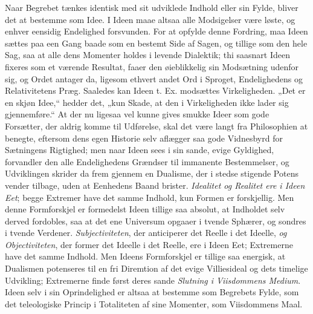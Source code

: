 \documentclass[12pt]{book}
\newcommand{\opage}[1]{\marginnote{\footnotesize\textit{[#1]}}}
\begin{document}
Naar Begrebet tænkes identisk med sit udviklede Indhold eller sin Fylde, bliver det at
bestemme som Idee. I Ideen maae altsaa alle Modsigelser være løste, og enhver eensidig
Endelighed forsvunden. For at opfylde denne Fordring, maa Ideen sættes paa een Gang
baade som en bestemt Side af Sagen, og tillige som den hele Sag, saa at alle dens
Momenter holdes i levende Dialektik; thi saasnart Ideen fixeres som et værende
Resultat, faaer den øieblikkelig sin Modsætning udenfor sig, og Ordet antager da,
ligesom ethvert andet Ord i Sproget, Endelighedens og Relativitetens Præg. Saaledes
kan Ideen t. Ex. modsættes Virkeligheden. „Det er en skjøn Idee,“ hedder det, „kun
Skade, at den i Virkeligheden ikke lader sig gjennemføre.“ At der nu ligesaa vel kunne
gives smukke Ideer som gode Forsætter, der aldrig komme til Udførelse, skal det være
langt fra Philosophien at benegte, eftersom dens egen Historie selv aflægger saa gode
Vidnesbyrd for Sætningens Rigtighed; men naar Ideen sees i sin sande, evige Gyldighed,
forvandler den alle Endelighedens Grændser til immanente Bestemmelser, og Udviklingen
skrider da frem gjennem en Dualisme, der i stedse stigende Potens vender tilbage, uden
\opage{249} %
at Eenhedens Baand brister. \emph{Idealitet og Realitet ere i Ideen Eet}; begge
Extremer have det samme Indhold, kun Formen er forskjellig. Men denne Formforskjel er
formedelst Ideen tillige saa absolut, at Indholdet selv derved fordobles, saa at det
ene Universum opgaaer i tvende Sphærer, og sondres i tvende Verdener.
\emph{Subjectiviteten}, der anticiperer det Reelle i det Ideelle,
\emph{og Objectiviteten}, der former det Ideelle i det Reelle, ere i Ideen Eet;
Extremerne have det samme Indhold. Men Ideens Formforskjel er tillige saa energisk, at
Dualismen potenseres til en fri Diremtion af det evige Villiesideal og dets timelige
Udvikling; Extremerne finde først deres sande \emph{Slutning i Viisdommens Medium}.
Ideen selv i sin Oprindelighed er altsaa at bestemme som Begrebets Fylde, som det
teleologiske Princip i Totaliteten af sine Momenter, som Viisdommens Maal.
\end{document}
